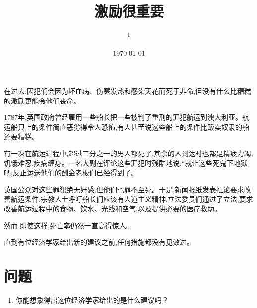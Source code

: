 \documentclass[10pt, a4paper]{ctexart} %
\title{激励很重要} %
\author{
	\authorstyle{鲁晓东\textsuperscript{1}} %
	\newline\newline %
	\textsuperscript{1}\institution{中山大学岭南学院经济学系}\\ %
}
\date{\today} %
\begin{document}
\maketitle %

\thispagestyle{firstpage} %


	
	







\section*{}



在过去,囚犯们会因为坏血病、伤寒发热和感染天花而死于非命,但没有什么比糟糕的激励更能令他们丧命。


1787年,英国政府曾经雇用一些船长把一些被判了重刑的罪犯航运到澳大利亚。航运船只上的条件简直恶劣得令人恐怖,有人甚至说这些船上的条件比贩卖奴隶的船还要糟糕。


有一次在航运过程中,超过三分之一的男人都死了,其余的人到达时也都是精疲力竭,饥饿难忍,疾病缠身。一名大副在评论这些罪犯时残酷地说:“就让这些死鬼下地狱吧,反正运送他们的酬金老板们已经得到了。


英国公众对这些罪犯绝无好感,但他们也罪不至死。于是,新闻报纸发表社论要求改善航运条件,宗教人士呼吁船长们应该有人道主义精神,立法委员们通过了立法,要求改善航运过程中的食物、饮水、光线和空气,以及提供必要的医疗救助。

然而,即使这样,死亡率仍然一直高得惊人。

直到有位经济学家给出新的建议之前,任何措施都没有见效过。

\section*{问题}
\begin{enumerate}
	\item 你能想象得出这位经济学家给出的是什么建议吗？
\end{enumerate}
\end{document}

